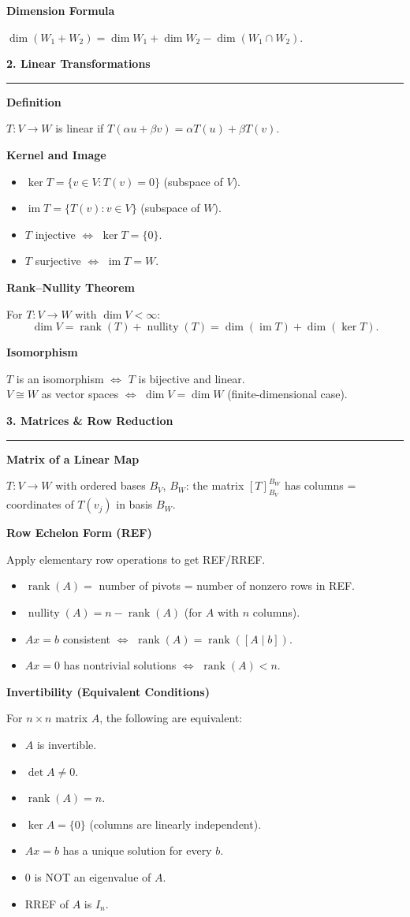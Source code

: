 \documentclass[10pt,twocolumn]{article}
\newcommand{\sect}[1]{\medskip\noindent\textbf{\large #1}\medskip\hrule\smallskip}
\newcommand{\subsect}[1]{\smallskip\noindent\textbf{#1}\par}
\DeclareMathOperator{\rank}{rank}
\DeclareMathOperator{\nullity}{nullity}
\DeclareMathOperator{\im}{im}
\begin{document}
\subsect{Dimension Formula}
$\dim(W_1+W_2)=\dim W_1+\dim W_2-\dim(W_1\cap W_2).$

\sect{2. Linear Transformations}

\subsect{Definition}
$T\colon V\to W$ is linear if $T(\alpha u+\beta v)=\alpha T(u)+\beta T(v)$.

\subsect{Kernel and Image}
\begin{itemize}[nosep,leftmargin=*]
\item $\ker T=\{v\in V:T(v)=0\}$ (subspace of $V$).
\item $\im T=\{T(v):v\in V\}$ (subspace of $W$).
\item $T$ injective $\iff$ $\ker T=\{0\}$.
\item $T$ surjective $\iff$ $\im T=W$.
\end{itemize}

\subsect{Rank--Nullity Theorem}
For $T\colon V\to W$ with $\dim V<\infty$:
\[
\dim V = \rank(T)+\nullity(T) = \dim(\im T)+\dim(\ker T).
\]

\subsect{Isomorphism}
$T$ is an isomorphism $\iff$ $T$ is bijective and linear.\\
$V\cong W$ as vector spaces $\iff$ $\dim V=\dim W$ (finite-dimensional case).

\sect{3. Matrices \& Row Reduction}

\subsect{Matrix of a Linear Map}
$T\colon V\to W$ with ordered bases $B_V$, $B_W$: the matrix $[T]_{B_V}^{B_W}$ has columns = coordinates of $T(v_j)$ in basis $B_W$.

\subsect{Row Echelon Form (REF)}
Apply elementary row operations to get REF/RREF.
\begin{itemize}[nosep,leftmargin=*]
\item $\rank(A)=$ number of pivots = number of nonzero rows in REF.
\item $\nullity(A)=n-\rank(A)$ (for $A$ with $n$ columns).
\item $Ax=b$ consistent $\iff$ $\rank(A)=\rank([A\mid b])$.
\item $Ax=0$ has nontrivial solutions $\iff$ $\rank(A)<n$.
\end{itemize}

\subsect{Invertibility (Equivalent Conditions)}
For $n\times n$ matrix $A$, the following are equivalent:
\begin{itemize}[nosep,leftmargin=*]
\item $A$ is invertible.
\item $\det A\neq 0$.
\item $\rank(A)=n$.
\item $\ker A=\{0\}$ (columns are linearly independent).
\item $Ax=b$ has a unique solution for every $b$.
\item $0$ is NOT an eigenvalue of $A$.
\item RREF of $A$ is $I_n$.
\end{itemize}
\end{document}
